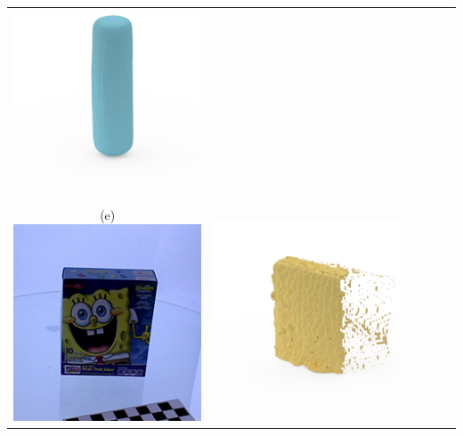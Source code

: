 \documentclass[10pt,onecolumn,letterpaper]{article}
\begin{document}
\begin{tabular}{cccccc}
\includegraphics[height=\turnheight, clip=true, trim=60 30 30 5]{pringles_bbq_NP1_312_oma_view_180} \\
(e) \includegraphics[height=\turnheight, clip=true, trim=20 30 30 5]{spongebob_squarepants_fruit_snaks.png} &
\includegraphics[height=\turnheight, clip=true, trim=60 30 30 5]{spongebob_squarepants_fruit_snaks_NP2_0_visible_pixels_view_90.png} &

\end{tabular}
\end{document}
